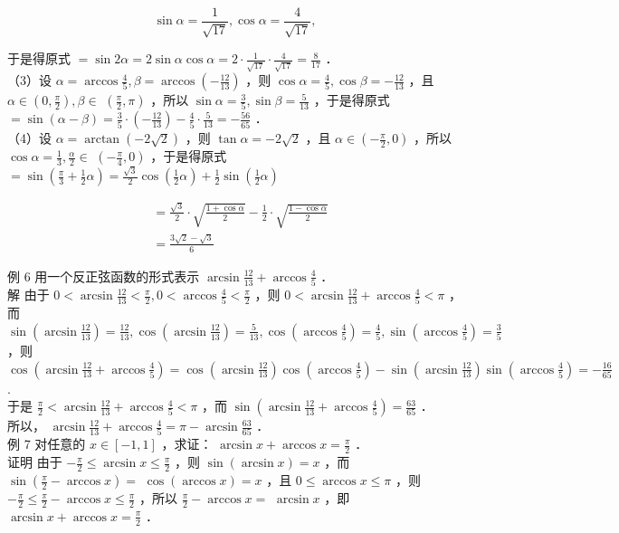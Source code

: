 \documentclass[10pt]{article}
\begin{document}
\[
\sin \alpha=\frac{1}{\sqrt{17}}, \cos \alpha=\frac{4}{\sqrt{17}},
\]

于是得原式 \(=\sin 2 \alpha=2 \sin \alpha \cos \alpha=2 \cdot \frac{1}{\sqrt{17}} \cdot \frac{4}{\sqrt{17}}=\frac{8}{17}\) ．\\
（3）设 \(\alpha=\arccos \frac{4}{5}, \beta=\arccos \left(-\frac{12}{13}\right)\) ，则 \(\cos \alpha=\frac{4}{5}, \cos \beta=-\frac{12}{13}\) ，且 \(\alpha \in\left(0, \frac{\pi}{2}\right), \beta \in\) \(\left(\frac{\pi}{2}, \pi\right)\) ，所以 \(\sin \alpha=\frac{3}{5}, \sin \beta=\frac{5}{13}\) ，于是得原式 \(=\sin (\alpha-\beta)=\frac{3}{5} \cdot\left(-\frac{12}{13}\right)-\frac{4}{5} \cdot \frac{5}{13}=-\frac{56}{65}\) ．\\
（4）设 \(\alpha=\arctan (-2 \sqrt{2})\) ，则 \(\tan \alpha=-2 \sqrt{2}\) ，且 \(\alpha \in\left(-\frac{\pi}{2}, 0\right)\) ，所以 \(\cos \alpha=\frac{1}{3}, \frac{\alpha}{2} \in\) \(\left(-\frac{\pi}{4}, 0\right)\) ，于是得原式 \(=\sin \left(\frac{\pi}{3}+\frac{1}{2} \alpha\right)=\frac{\sqrt{3}}{2} \cos \left(\frac{1}{2} \alpha\right)+\frac{1}{2} \sin \left(\frac{1}{2} \alpha\right)\)

\[
\begin{aligned}
& =\frac{\sqrt{3}}{2} \cdot \sqrt{\frac{1+\cos \alpha}{2}}-\frac{1}{2} \cdot \sqrt{\frac{1-\cos \alpha}{2}} \\
& =\frac{3 \sqrt{2}-\sqrt{3}}{6}
\end{aligned}
\]

例 6 用一个反正弦函数的形式表示 \(\arcsin \frac{12}{13}+\arccos \frac{4}{5}\) ．\\
解 由于 \(0<\arcsin \frac{12}{13}<\frac{\pi}{2}, 0<\arccos \frac{4}{5}<\frac{\pi}{2}\) ，则 \(0<\arcsin \frac{12}{13}+\arccos \frac{4}{5}<\pi\) ，而 \(\sin \left(\arcsin \frac{12}{13}\right)=\frac{12}{13}, \cos \left(\arcsin \frac{12}{13}\right)=\frac{5}{13}, \cos \left(\arccos \frac{4}{5}\right)=\frac{4}{5}, \sin \left(\arccos \frac{4}{5}\right)=\frac{3}{5}\) ，则\\
\(\cos \left(\arcsin \frac{12}{13}+\arccos \frac{4}{5}\right)=\cos \left(\arcsin \frac{12}{13}\right) \cos \left(\arccos \frac{4}{5}\right)-\sin \left(\arcsin \frac{12}{13}\right) \sin \left(\arccos \frac{4}{5}\right)=-\frac{16}{65}\).\\
于是 \(\frac{\pi}{2}<\arcsin \frac{12}{13}+\arccos \frac{4}{5}<\pi\) ，而 \(\sin \left(\arcsin \frac{12}{13}+\arccos \frac{4}{5}\right)=\frac{63}{65}\) ．\\
所以， \(\arcsin \frac{12}{13}+\arccos \frac{4}{5}=\pi-\arcsin \frac{63}{65}\) ．\\
例 7 对任意的 \(x \in[-1,1]\) ，求证： \(\arcsin x+\arccos x=\frac{\pi}{2}\) ．\\
证明 由于 \(-\frac{\pi}{2} \leqslant \arcsin x \leqslant \frac{\pi}{2}\) ，则 \(\sin (\arcsin x)=x\) ，而 \(\sin \left(\frac{\pi}{2}-\arccos x\right)=\) \(\cos (\arccos x)=x\) ，且 \(0 \leqslant \arccos x \leqslant \pi\) ，则 \(-\frac{\pi}{2} \leqslant \frac{\pi}{2}-\arccos x \leqslant \frac{\pi}{2}\) ，所以 \(\frac{\pi}{2}-\arccos x=\) \(\arcsin x\) ，即 \(\arcsin x+\arccos x=\frac{\pi}{2}\) ．
\end{document}
